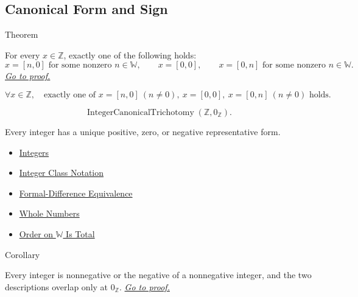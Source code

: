 \subsection*{Canonical Form and Sign}

\begin{theorembox}{Theorem}
\begin{theorem}
\label{thm:canonical-form-of-integers}
For every $x\in\mathbb{Z}$, exactly one of the following holds:
\[
x=[n,0]\text{ for some nonzero }n\in\mathbb{W},\qquad
x=[0,0],\qquad
x=[0,n]\text{ for some nonzero }n\in\mathbb{W}.
\]
\hyperref[prf:canonical-form-of-integers]{\textit{Go to proof.}}
\end{theorem}
\end{theorembox}

\begin{remark*}
\[
\forall x\in\mathbb{Z},\quad
\text{exactly one of }x=[n,0]\ (n\ne0),\ x=[0,0],\ x=[0,n]\ (n\ne0)\text{ holds}.
\]
\end{remark*}

\begin{remark*}
\[
\operatorname{IntegerCanonicalTrichotomy}(\mathbb{Z},0_{\mathbb{Z}}).
\]
\end{remark*}

\begin{remark*}[Interpretation]
Every integer has a unique positive, zero, or negative representative form.
\end{remark*}

\begin{dependencies}
\begin{itemize}
  \item \hyperref[def:integers]{Integers}
  \item \hyperref[def:integer-class-notation]{Integer Class Notation}
  \item \hyperref[def:formal-difference-equivalence]{Formal-Difference Equivalence}
  \item \hyperref[def:whole-numbers]{Whole Numbers}
  \item \hyperref[thm:order-on-w-total]{Order on $\mathbb{W}$ Is Total}
\end{itemize}
\end{dependencies}

\begin{corollarybox}{Corollary}
\begin{corollary}
\label{cor:integers-split-by-sign}
Every integer is nonnegative or the negative of a nonnegative integer, and
the two descriptions overlap only at $0_{\mathbb{Z}}$.
\hyperref[prf:integers-split-by-sign]{\textit{Go to proof.}}
\end{corollary}
\end{corollarybox}

